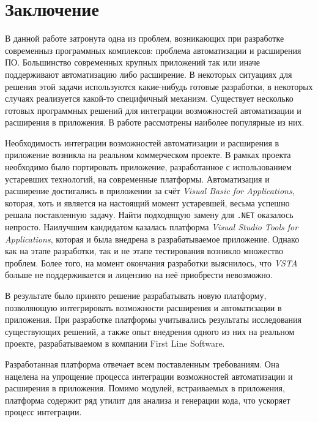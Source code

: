 



\setcounter{secnumdepth}{0}
\section{Заключение}
\setcounter{secnumdepth}{2}

В данной работе затронута одна из проблем, возникающих при разработке современныз программных комплексов: проблема автоматизации и расширения ПО. Большинство современных крупных приложений так или иначе поддерживают автоматизацию либо расширение. В некоторых ситуациях для решения этой задачи используются какие-нибудь готовые разработки, в некоторых случаях реализуется какой-то специфичный механизм. Существует несколько готовых программных решений для интеграции возможностей автоматизации и расширения в приложения. В работе рассмотрены наиболее популярные из них. 

Необходимость интеграции возможностей автоматизации и расширения в приложение возникла на реальном коммерческом проекте. В рамках проекта необходимо было портировать приложение, разработанное с использованием устаревших технологий, на современные платформы. Автоматизация и расширение достигались в приложении за счёт {\it Visual Basic for Applications}, которая, хоть и является на настоящий момент устаревшей, весьма успешно решала поставленную задачу. Найти подходящую замену для {\tt .NET} оказалось непросто. Наилучшим кандидатом казалась платформа {\it Visual Studio Tools for Applications}, которая и была внедрена в разрабатываемое приложение. Однако как на этапе разработки, так и не этапе тестирования возникло множество проблем. Более того, на момент окончания разработки выяснилось, что {\it VSTA} больше не поддерживается и лицензию на неё приобрести невозможно.

В результате было принято решение разрабатывать новую платформу, позволяющую интегрировать возможности расширения и автоматизации в приложения. При разработке платформы учитывались результаты исследования существующих решений, а также опыт внедрения одного из них на реальном проекте, разрабатываемом в компании First Line Software.

Разработанная платформа отвечает всем поставленным требованиям. Она нацелена на упрощение процесса интеграции возможностей автоматизации и расширения в приложения. Помимо модулей, встраиваемых в приложения, платформа содержит ряд утилит для анализа и генерации кода, что ускоряет процесс интеграции.

\pagebreak